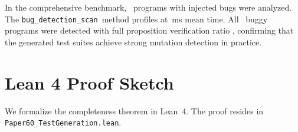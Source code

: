 \documentclass[11pt]{article}
\newcommand{\BugScan}{\texttt{bug\_detection\_scan}}
\begin{document}
In the comprehensive benchmark, \compBuggyCount\ programs with injected
bugs were analyzed.  The \BugScan\ method profiles at
\compProfBugDetectionScanMeanMs\,ms mean time.  All \compBuggyFullPass\
buggy programs were detected with full proposition verification ratio
\compBuggyMeanPropRatio, confirming that the generated test suites
achieve strong mutation detection in practice.

\section{Lean 4 Proof Sketch}\label{sec:lean-proof}

We formalize the completeness theorem in Lean~4.  The proof resides in
\texttt{Paper60\_TestGeneration.lean}.
\end{document}
